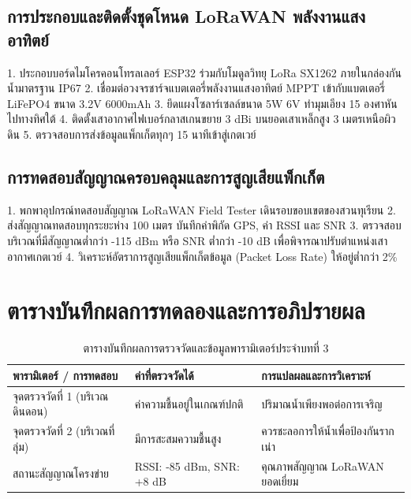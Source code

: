 \subsection{การประกอบและติดตั้งชุดโหนด LoRaWAN พลังงานแสงอาทิตย์}
\begin{sensorbox}
1. ประกอบบอร์ดไมโครคอนโทรลเลอร์ ESP32 ร่วมกับโมดูลวิทยุ LoRa SX1262 ภายในกล่องกันน้ำมาตรฐาน IP67
2. เชื่อมต่อวงจรชาร์จแบตเตอรี่พลังงานแสงอาทิตย์ MPPT เข้ากับแบตเตอรี่ LiFePO4 ขนาด 3.2V 6000mAh
3. ยึดแผงโซลาร์เซลล์ขนาด 5W 6V ทำมุมเอียง 15 องศาหันไปทางทิศใต้
4. ติดตั้งเสาอากาศไฟเบอร์กลาสเกนขยาย 3 dBi บนยอดเสาเหล็กสูง 3 เมตรเหนือผิวดิน
5. ตรวจสอบการส่งข้อมูลแพ็กเก็ตทุกๆ 15 นาทีเข้าสู่เกตเวย์
\end{sensorbox}

\subsection{การทดสอบสัญญาณครอบคลุมและการสูญเสียแพ็กเก็ต}
\begin{sensorbox}
1. พกพาอุปกรณ์ทดสอบสัญญาณ LoRaWAN Field Tester เดินรอบขอบเขตของสวนทุเรียน
2. ส่งสัญญาณทดสอบทุกระยะห่าง 100 เมตร บันทึกค่าพิกัด GPS, ค่า RSSI และ SNR
3. ตรวจสอบบริเวณที่มีสัญญาณต่ำกว่า -115 dBm หรือ SNR ต่ำกว่า -10 dB เพื่อพิจารณาปรับตำแหน่งเสาอากาศเกตเวย์
4. วิเคราะห์อัตราการสูญเสียแพ็กเก็ตข้อมูล (Packet Loss Rate) ให้อยู่ต่ำกว่า 2\%
\end{sensorbox}

\section{ตารางบันทึกผลการทดลองและการอภิปรายผล}
\begin{table}[H]
\centering\small
\caption{ตารางบันทึกผลการตรวจวัดและข้อมูลพารามิเตอร์ประจำบทที่ 3}
\label{tab:ch03_datasheet}
\begin{tabularx}{\textwidth}{p{} p{} X}
\toprule
\textbf{พารามิเตอร์ / การทดสอบ} & \textbf{ค่าที่ตรวจวัดได้} & \textbf{การแปลผลและการวิเคราะห์} \\
\midrule
จุดตรวจวัดที่ 1 (บริเวณดินดอน) & ค่าความชื้นอยู่ในเกณฑ์ปกติ & ปริมาณน้ำเพียงพอต่อการเจริญ \\
จุดตรวจวัดที่ 2 (บริเวณที่ลุ่ม) & มีการสะสมความชื้นสูง & ควรชะลอการให้น้ำเพื่อป้องกันรากเน่า \\
สถานะสัญญาณโครงข่าย & RSSI: -85 dBm, SNR: +8 dB & คุณภาพสัญญาณ LoRaWAN ยอดเยี่ยม \\
\bottomrule
\end{tabularx}
\end{table}

